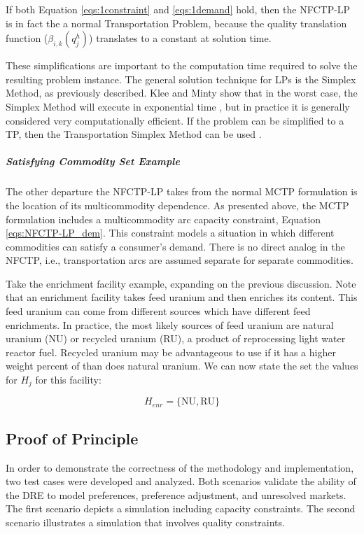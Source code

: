 If both Equation \ref{eqs:1constraint} and \ref{eqs:1demand} hold, then the
NFCTP-LP is in fact the a normal Transportation Problem, because the quality
translation function ($\beta_{i,k}(q_{j}^{h})$) translates to a constant at
solution time. 

These simplifications are important to the computation time required to solve
the resulting problem instance. The general solution technique for LPs is the
Simplex Method, as previously described. Klee and Minty show that in the worst
case, the Simplex Method will execute in exponential time \cite{klee_good_1970},
but in practice it is generally considered very computationally efficient. If
the problem can be simplified to a TP, then the Transportation Simplex Method
can be used \cite{ahuja_network_1993}.

\subparagraph{Satisfying Commodity Set Example}

The other departure the NFCTP-LP takes from the normal MCTP formulation is the
location of its multicommodity dependence. As presented above, the
MCTP formulation includes a multicommodity arc capacity constraint, Equation
\ref{eqs:NFCTP-LP_dem}. This constraint models a
situation in which different commodities can satisfy a consumer's demand. There
is no direct analog in the NFCTP, i.e., transportation arcs are assumed separate
for separate commodities.

Take the enrichment facility example, expanding on the previous discussion. Note
that an enrichment facility takes feed uranium and then enriches its 
content. This feed uranium can come from different sources which have different
feed enrichments. In practice, the most likely sources of feed uranium are
natural uranium (NU) or recycled uranium (RU), a product of reprocessing light
water reactor fuel. Recycled uranium may be advantageous to use if it has a
higher weight percent of  than does natural uranium. We can now state the
set the values for $H_{j}$ for this facility:

\begin{equation}\label{eqs:enr-dem-commods}
  H_{enr} = \{ \mbox{NU}, \mbox{RU} \}
\end{equation}

\subsection{Proof of Principle}\label{abm:dre:proof}

In order to demonstrate the correctness of the methodology and implementation,
two test cases were developed and analyzed. Both scenarios validate the ability
of the DRE to model preferences, preference adjustment, and unresolved
markets. The first scenario depicts a simulation including capacity
constraints. The second scenario illustrates a simulation that involves quality
constraints.


